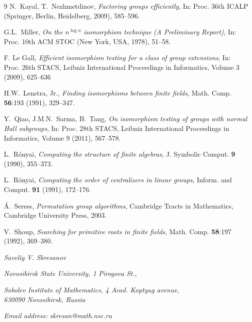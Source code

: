 \documentclass{article}
\begin{document}
\begin{thebibliography}{9}
	N.~Kayal, T.~Nezhmetdinov, \emph{Factoring groups efficiently}, In: Proc. 36th ICALP (Springer, Berlin, Heidelberg, 2009), 585--596.

	G.L.~Miller,
	\emph{On the $ n^{\log n}$ isomorphism technique (A Preliminary Report)},
	In: Proc. 10th ACM STOC (New York, USA, 1978), 51--58.

	F. Le Gall,
	\emph{Efficient isomorphism testing for a class of group extensions},
	In: Proc. 26th STACS, Leibniz International Proceedings in Informatics, Volume 3 (2009), 625--636

	H.W.~Lenstra, Jr., \emph{Finding isomorphisms between finite fields}, Math. Comp. \textbf{56}:193 (1991), 329--347.

	Y.~Qiao, J.M.N.~Sarma, B.~Tang,
	\emph{On isomorphism testing of groups with normal Hall subgroups},
	In: Proc. 28th STACS, Leibniz International Proceedings in Informatics, Volume 9 (2011), 567--578.

	L.~R\'onyai, \emph{Computing the structure of finite algebras}, J. Symbolic Comput. \textbf{9} (1990), 355--373.

	L.~R\'onyai, \emph{Computing the order of centralizers in linear groups}, Inform. and Comput. \textbf{91} (1991), 172--176.

	\'A.~Seress, \emph{Permutation group algorithms}, Cambridge Tracts in Mathematics, Cambridge University Press, 2003.

	V.~Shoup, \emph{Searching for primitive roots in finite fields}, Math. Comp. \textbf{58}:197 (1992), 369--380.

\end{thebibliography}
\bigskip

\noindent
\emph{Saveliy V. Skresanov}

\noindent
\emph{Novosibirsk State University, 1 Pirogova St.,}

\noindent
\emph{Sobolev Institute of Mathematics, 4 Acad. Koptyug avenue,\\ 630090 Novosibirsk, Russia}

\noindent
\emph{Email address: skresan@math.nsc.ru}
\end{document}
